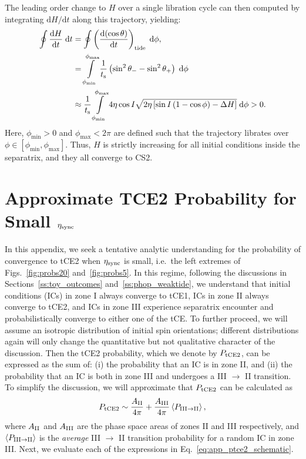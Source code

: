 \documentclass[
        fleqn,
        usenatbib,
    ]{mnras}
\newcommand*{\rd}[2]{\frac{\mathrm{d}#1}{\mathrm{d}#2}}
\newcommand*{\rdil}[2]{\mathrm{d}#1/\mathrm{d}#2}
\newcommand*{\ev}[1]{\left\langle#1\right\rangle}
\newcommand*{\p}[1]{\left(#1\right)}
\newcommand*{\s}[1]{\left[#1\right]}
\begin{document}
The leading order change to $H$ over a single libration cycle can then computed by
integrating $\rdil{H}{t}$ along this trajectory, yielding:
\begin{align}
    \oint \rd{H}{t}\;\mathrm{d}t
        &= \oint \p{\rd{(\cos \theta)}{t}}_{\rm tide}
            \;\mathrm{d}\phi,\nonumber\\
        &= \int\limits_{\phi_{\min}}^{\phi_{\max}}
                \frac{1}{t_{\rm s}}
                \p{\sin^2\theta_- - \sin^2\theta_+} \;\mathrm{d}\phi\nonumber\\
        &\approx \frac{1}{t_{\rm s}}
            \int\limits_{\phi_{\min}}^{\phi_{\max}}
                4\eta \cos I \sqrt{2\eta\s{\sin I\p{1 - \cos \phi} - \Delta H}}
                \;\mathrm{d}\phi > 0.
\end{align}
Here, $\phi_{\min} > 0$ and $\phi_{\max} < 2\pi$ are defined such that the
trajectory librates over $\phi \in \s{\phi_{\min}, \phi_{\max}}$. Thus, $H$ is
strictly increasing for all initial conditions inside the separatrix, and they
all converge to CS2.

\section{Approximate TCE2 Probability for Small $\eta_{\rm sync}$
}\label{app:ptce2}

In this appendix, we seek a tentative analytic understanding for the
probability of convergence to tCE2 when $\eta_{\rm sync}$ is small, i.e.\ the
left extremes of Figs.~\ref{fig:probs20} and~\ref{fig:probs5}. In this regime,
following the discussions in Sections~\ref{ss:toy_outcomes}
and~\ref{ss:phop_weaktide}, we understand that initial conditions (ICs) in zone I
always converge to tCE1, ICs in zone II always converge to tCE2,
and ICs in zone III experience separatrix encounter and
probabilistically converge to either one of the tCE\@. To further proceed, we
will assume an isotropic distribution of initial spin orientations; different
distributions again will only change the quantitative but not qualitative
character of the discussion. Then the tCE2 probability, which we denote by
$P_{\rm tCE2}$, can be expressed as the sum of: (i) the probability that an IC
is in zone II, and (ii) the probability that an IC is both in zone III and
undergoes a III $\to$ II transition. To simplify the discussion, we will
approximate that $P_{\rm tCE2}$ can be calculated as
\begin{equation}
    P_{\rm tCE2} \sim \frac{A_{\rm II}}{4\pi}
            + \frac{A_{\rm III}}{4\pi}\ev{P_{\rm III \to II}},
            \label{eq:app_ptce2_schematic}
\end{equation}
where $A_{\rm II}$ and $A_{\rm III}$ are the phase space areas of zones II and
III respectively, and $\ev{P_{\rm III \to II}}$ is the \emph{average} III $\to$
II transition probability for a random IC in zone III\@. Next, we evaluate each
of the expressions in Eq.~\eqref{eq:app_ptce2_schematic}.
\end{document}
